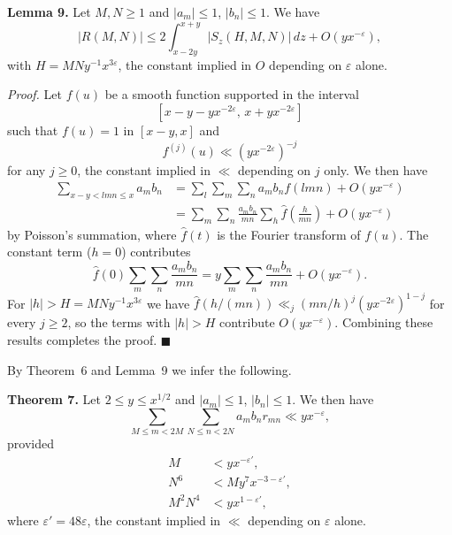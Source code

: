 \documentclass[10pt]{article}
\begin{document}
\medskip
\noindent\textbf{Lemma 9.}
Let $M,N\ge1$ and $|a_m|\le1$, $|b_n|\le1$. We have
\[
 |R(M,N)|\le2\int_{x-2y}^{x+y}|S_z(H,M,N)|\,dz
 +O(yx^{-\varepsilon}),
\]
with $H=MNy^{-1}x^{3\varepsilon}$, the constant implied in $O$ depending
on $\varepsilon$ alone.

\medskip
\noindent\textit{Proof.}
Let $f(u)$ be a smooth function supported in the interval
\[
 [x-y-yx^{-2\varepsilon},\,x+yx^{-2\varepsilon}]
\]
such that $f(u)=1$ in $[x-y,x]$ and
\[
 f^{(j)}(u)\ll(yx^{-2\varepsilon})^{-j}
\]
for any $j\ge0$, the constant implied in $\ll$ depending on $j$ only.
We then have
\[
\begin{aligned}
\sum_{x-y<lmn\le x}a_mb_n
 &=\sum_l\sum_m\sum_n a_mb_nf(lmn)+O(yx^{-\varepsilon})\\
 &=\sum_m\sum_n\frac{a_mb_n}{mn}
   \sum_h\widehat f\left(\frac{h}{mn}\right)+O(yx^{-\varepsilon})
\end{aligned}
\]
by Poisson's summation, where $\widehat f(t)$ is the Fourier transform of
$f(u)$. The constant term ($h=0$) contributes
\[
 \widehat f(0)\sum_m\sum_n\frac{a_mb_n}{mn}
 =y\sum_m\sum_n\frac{a_mb_n}{mn}+O(yx^{-\varepsilon}).
\]
For $|h|>H=MNy^{-1}x^{3\varepsilon}$ we have
$\widehat f(h/(mn))\ll_j (mn/h)^{j}(yx^{-2\varepsilon})^{1-j}$ for every $j\ge2$, so the terms with $|h|>H$ contribute
$O(yx^{-\varepsilon})$. Combining these results completes the proof.
\(\blacksquare\)

By Theorem~6 and Lemma~9 we infer the following.

\medskip
\noindent\textbf{Theorem 7.}
Let $2\le y\le x^{1/2}$ and $|a_m|\le1$, $|b_n|\le1$. We then have
\begin{equation*}
 \sum_{M\le m<2M}\sum_{N\le n<2N}a_mb_nr_{mn}
 \ll yx^{-\varepsilon},
\tag{7.3}
\end{equation*}
provided
\begin{align*}
 M&<yx^{-\varepsilon'},                                      \tag{7.4}\\
 N^6&<My^7x^{-3-\varepsilon'},                               \tag{7.5}\\
 M^2N^4&<yx^{1-\varepsilon'},                                \tag{7.6}
\end{align*}
where $\varepsilon'=48\varepsilon$, the constant implied in $\ll$
depending on $\varepsilon$ alone.
\end{document}
